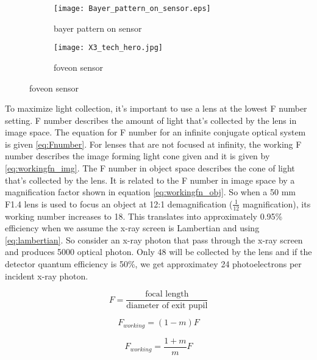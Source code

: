 \begin{figure}[ht]
	\begin{subfigure}[b]{0.4\linewidth}
		\centering
		\texttt{[image: Bayer\_pattern\_on\_sensor.eps]}
		\caption{bayer pattern on sensor}
		\label{fig:bayer_pattern_on_sensor}
	\end{subfigure}
	\hspace{0.5cm}
	\begin{subfigure}[b]{0.4\linewidth}
		\centering
		\texttt{[image: X3\_tech\_hero.jpg]}
		\caption{foveon sensor}
		\label{fig:foveon_sensor}
	\end{subfigure}
\end{figure}

To maximize light collection, it's important to use a lens at the lowest F number setting.  F number describes the amount of light that's collected by the lens in image space.  The equation for F number for an infinite conjugate optical system is given \ref{eq:Fnumber}.  For lenses that are not focused at infinity, the working F number describes the image forming light cone given and it is given by \ref{eq:workingfn_img}.  The F number in object space describes the cone of light that's collected by the lens.  It is related to the F number in image space by a magnification factor shown in equation \ref{eq:workingfn_obj}.  So when a 50 mm F1.4 lens is used to focus an object at 12:1 demagnification ($\frac{1}{12}$ magnification), its working number increases to 18.  This translates into approximately 0.95\% efficiency when we assume the x-ray screen is Lambertian and using \eqref{eq:lambertian}.  So consider an x-ray photon that pass through the x-ray screen and produces 5000 optical photon.  Only 48 will be collected by the lens and if the detector quantum efficiency is 50\%, we get approximatey 24 photoelectrons per incident x-ray photon.


\begin{equation}\label{eq:Fnumber}
F = \frac{\mbox{focal length}}{\mbox{diameter of exit pupil}}
\end{equation}
	
\begin{equation}\label{eq:workingfn_img}
F_{working} = (1 - m)F
\end{equation}
	
\begin{equation}\label{eq:workingfn_obj}
F_{working} = \frac{1+m}{m}F
\end{equation}
	

